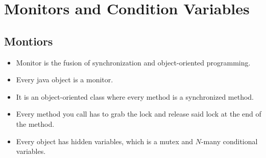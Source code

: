\documentclass[]{article}
\begin{document}
\section{Monitors and Condition Variables}
\subsection{Montiors}
\begin{itemize}
\item Monitor is the fusion of synchronization and object-oriented programming.
\item Every java object is a monitor.
\item It is an object-oriented class where every method is a synchronized
method.
\item Every method you call has to grab the lock and release said lock at the
end of the method.
\item Every object has hidden variables, which is a mutex and $N$-many
conditional variables.
\end{itemize}
\end{document}
